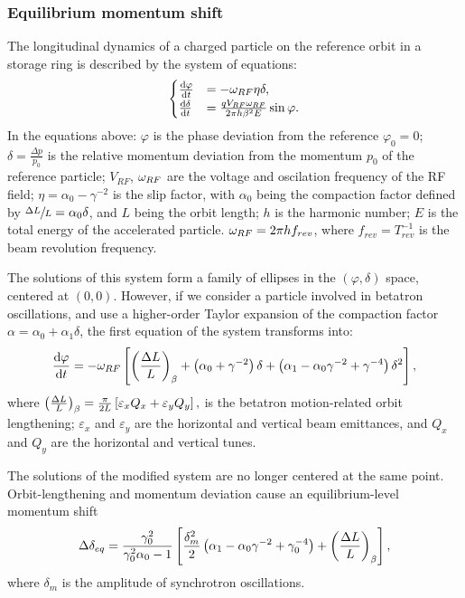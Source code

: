 \documentclass{article}
\begin{document}
\subsubsection{Equilibrium momentum shift}
The longitudinal dynamics of a charged particle on the reference orbit in a storage ring is described by the system of equations:
\begin{equation*}
  \begin{cases}
    \frac{\mathrm{d} {\varphi}}{\mathrm{d} t} &= -\omega_{RF}\eta\delta, \\
    \frac{\mathrm{d} {\delta}}{\mathrm{d} t} &= \frac{q V_{RF}\omega_{RF}}{2\pi h\beta^2E}\sin\varphi.
  \end{cases}
\end{equation*}
In the equations above: $\varphi$ is the phase deviation from the reference $\varphi_0 = 0$; $\delta = \frac{\Delta p}{p_0}$ is the relative momentum deviation from the momentum $p_0$ of the reference particle; $V_{RF}$, $\omega_{RF}$ are the voltage and oscilation frequency of the RF field; $\eta = \alpha_0 - \gamma^{-2}$ is the slip factor, with $\alpha_0$ being the compaction factor defined by $\sfrac{\Delta L}{L} = \alpha_0\delta$, and $L$ being the orbit length; $h$ is the harmonic number; $E$ is the total energy of the accelerated particle. $\omega_{RF} = 2\pi h f_{rev}$, where $f_{rev}=T_{rev}^{-1}$ is the beam revolution frequency.

The solutions of this system form a family of ellipses in the $(\varphi, \delta)$ space, centered at $(0,0)$. However, if we consider a particle involved in betatron oscillations, and use a higher-order Taylor expansion of the compaction factor $\alpha = \alpha_0 + \alpha_1\delta$, the first equation of the system transforms into:~\citep[p.~2579]{Senichev:IPAC13}
\[
\ddt{\varphi} = -\w_{RF} \bkt*{\bkt{\frac{\Delta L}{L}}_\beta + \bkt{\alpha_0 + \gamma^{-2}}\delta + \bkt{\alpha_1 - \alpha_0\gamma^{-2} + \gamma^{-4}}\delta^2},
\]
where $\bkt{\frac{\Delta L}{L}}_\beta = \frac{\pi}{2L}\bkt*{\varepsilon_xQ_x + \varepsilon_yQ_y},$ is the betatron motion-related orbit lengthening; $\varepsilon_x$ and $\varepsilon_y$ are the horizontal and vertical beam emittances, and $Q_x$ and $Q_y$ are the horizontal and vertical tunes.~\citep[p.~2580]{Senichev:IPAC13}

The solutions of the modified system are no longer centered at the same point. Orbit-lengthening and momentum deviation cause an equilibrium-level momentum shift~\citep[p.~2581]{Senichev:IPAC13}
\begin{equation}\label{eq:EquLevMom_shift}
  \Delta\delta_{eq} = \frac{\gamma_0^2}{\gamma_0^2\alpha_0 - 1}\bkt*{\frac{\delta_m^2}{2}\bkt{\alpha_1 - \alpha_0\gamma^{-2} + \gamma_0^{-4}} + \bkt{\frac{\Delta L}{L}}_\beta},
\end{equation}
where $\delta_m$ is the amplitude of synchrotron oscillations.
\end{document}
